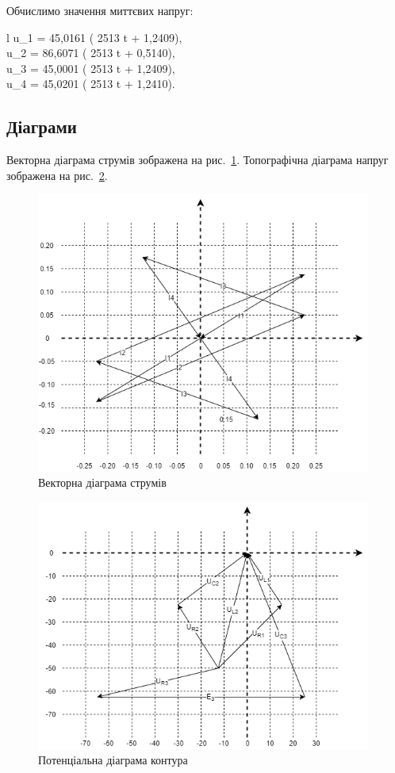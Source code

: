 \documentclass[a4paper,oneside,DIV=12,12pt]{scrartcl}
\begin{document}
				Обчислимо значення миттєвих напруг:
				\begin{IEEEeqnarray*}{l}
					u_1 = 45{,}0161 \cdot \sin \left( 2513 t + 1{,}2409\right),\\
					u_2 = 86{,}6071 \cdot \sin \left( 2513 t + 0{,}5140\right),\\
					u_3 = 45{,}0001 \cdot \sin \left( 2513 t + 1{,}2409\right),\\
					u_4 = 45{,}0201 \cdot \sin \left( 2513 t + 1{,}2410\right).
				\end{IEEEeqnarray*}
		\subsection{Діаграми}
			Векторна діаграма струмів зображена на рис.~\ref{fig:02-03-diagram-currents}. Топографічна діаграма напруг зображена на рис.~\ref{fig:02-04-diagram-voltages}.
			
			\begin{figure}[!htbp]
			\centering
				\includegraphics[width = 110mm]{assets/02-03-diagram-currents.png}
			\caption{Векторна діаграма струмів}
			\label{fig:02-03-diagram-currents}
			\end{figure}
			
			\begin{figure}[!htbp]
			\centering
				\includegraphics[width = 110mm]{assets/02-04-diagram-voltages.png}
			\caption{Потенціальна діаграма контура}
			\label{fig:02-04-diagram-voltages}
			\end{figure}
\end{document}

